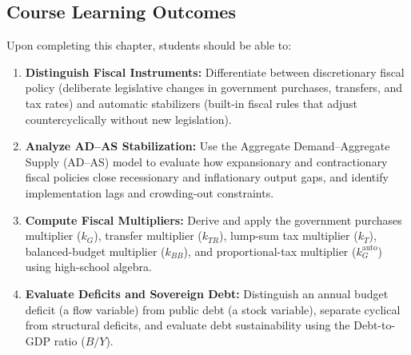 \documentclass[11pt,letterpaper]{article}
\begin{document}
\subsection*{Course Learning Outcomes}
Upon completing this chapter, students should be able to:
\begin{enumerate}
    \item \textbf{Distinguish Fiscal Instruments:} Differentiate between discretionary fiscal policy (deliberate legislative changes in government purchases, transfers, and tax rates) and automatic stabilizers (built-in fiscal rules that adjust countercyclically without new legislation).
    \item \textbf{Analyze AD--AS Stabilization:} Use the Aggregate Demand--Aggregate Supply (AD--AS) model to evaluate how expansionary and contractionary fiscal policies close recessionary and inflationary output gaps, and identify implementation lags and crowding-out constraints.
    \item \textbf{Compute Fiscal Multipliers:} Derive and apply the government purchases multiplier ($k_G$), transfer multiplier ($k_{TR}$), lump-sum tax multiplier ($k_T$), balanced-budget multiplier ($k_{BB}$), and proportional-tax multiplier ($k_G^{\text{auto}}$) using high-school algebra.
    \item \textbf{Evaluate Deficits and Sovereign Debt:} Distinguish an annual budget deficit (a flow variable) from public debt (a stock variable), separate cyclical from structural deficits, and evaluate debt sustainability using the Debt-to-GDP ratio ($B/Y$).
\end{enumerate}
\end{document}
